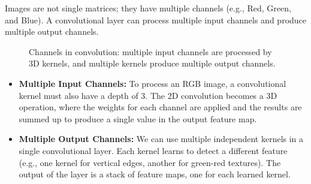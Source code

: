 \documentclass{article}
\begin{document}
Images are not single matrices; they have multiple channels (e.g., Red, Green, and Blue). A convolutional layer can process multiple input channels and produce multiple output channels.

\begin{figure}[h]
\centering
{}
\caption{Channels in convolution: multiple input channels are processed by 3D kernels, and multiple kernels produce multiple output channels.}
\end{figure}

\begin{itemize}
    \item \textbf{Multiple Input Channels:} To process an RGB image, a convolutional kernel must also have a depth of 3. The 2D convolution becomes a 3D operation, where the weights for each channel are applied and the results are summed up to produce a single value in the output feature map.
    \item \textbf{Multiple Output Channels:} We can use multiple independent kernels in a single convolutional layer. Each kernel learns to detect a different feature (e.g., one kernel for vertical edges, another for green-red textures). The output of the layer is a stack of feature maps, one for each learned kernel.
\end{itemize}
\end{document}
